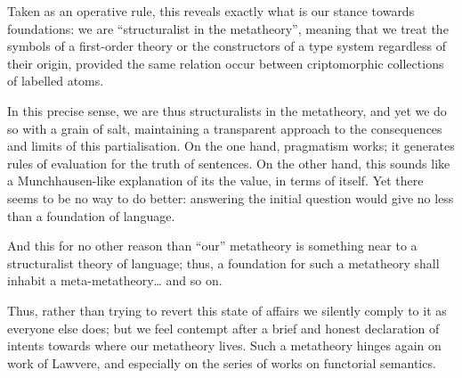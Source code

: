 Taken as an operative rule, this reveals exactly what is our stance towards foundations: we are ``structuralist in the metatheory'', meaning that we treat the symbols of a first-order theory or the constructors of a type system regardless of their origin, provided the same relation occur between criptomorphic collections of labelled atoms.

In this precise sense, we are thus structuralists in the metatheory, and yet we do so with a grain of salt, maintaining a transparent approach to the consequences and limits of this partialisation. On the one hand, pragmatism works; it generates rules of evaluation for the truth of sentences. On the other hand, this sounds like a Munchhausen-like explanation of its the value, in terms of itself. Yet there seems to be no way to do better: answering the initial question would give no less than a foundation of language.

And this for no other reason than ``our'' metatheory is something near to a structuralist theory of language; thus, a foundation for such a metatheory shall inhabit a meta-metatheory\dots{} and so on.

Thus, rather than trying to revert this state of affairs we silently comply to it as everyone else does; but we feel contempt after a brief and honest declaration of intents towards where our metatheory lives. Such a metatheory hinges again on work of Lawvere, and especially on the series of works on functorial semantics.